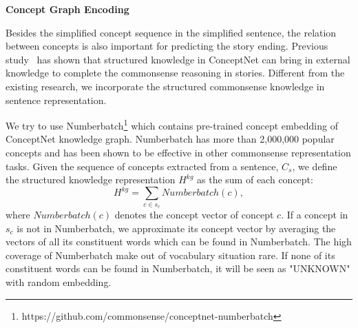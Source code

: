 

\textbf{Concept Graph Encoding}

Besides the simplified concept sequence in the simplified sentence,
the relation between concepts is also important for 
predicting the story ending. 
Previous study~\cite{chen2018incorporating,guan2018story} 
has shown that structured knowledge in ConceptNet can bring in external 
knowledge to complete the commonsense reasoning in stories.
Different from the existing research,
we incorporate the structured commonsense knowledge
in sentence representation. 

We try to use Numberbatch\footnote{https://github.com/commonsense/conceptnet-numberbatch} which 
contains pre-trained concept embedding of ConceptNet knowledge graph.
Numberbatch has more than 2,000,000 popular concepts and 
has been shown to be effective in other 
commonsense representation tasks\cite{speer2017conceptnet2}. 
Given the sequence of concepts extracted from a sentence, $C_s$,
we define the structured knowledge representation $H^{kg}$
as the sum of each concept:
\begin{equation}
  H^{kg} = \sum_{c \in s_c}{Numberbatch(c)},
\end{equation}
\noindent
where $Numberbatch(c)$ denotes the concept vector of concept $c$.
If a concept in $s_c$ is not in Numberbatch, we approximate its concept vector
by averaging the vectors of all its constituent words which can be found 
in Numberbatch.  The high coverage of  
Numberbatch make out of vocabulary situation rare. If none of its constituent 
words can be found in Numberbatch, 
it will be seen as "UNKNOWN" with random embedding.

